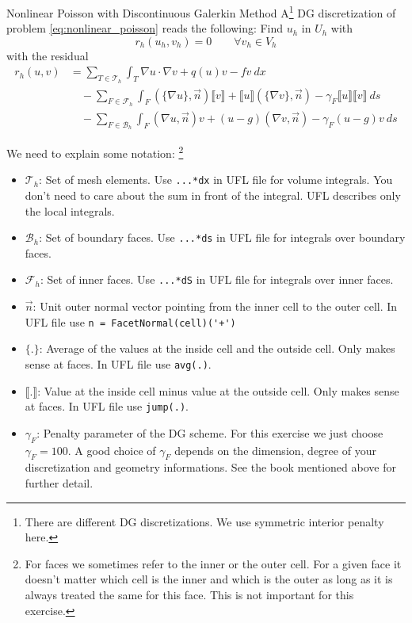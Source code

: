 \documentclass[12pt,a4paper]{article}
\newcommand\jump[1]{\llbracket #1 \rrbracket}
\newcommand\avg[1]{\{ #1 \}}
\begin{document}
\begin{Exercise}{Nonlinear Poisson with Discontinuous Galerkin Method}
  A\footnote{There are different DG discretizations. We use symmetric interior penalty here.} DG discretization of problem \eqref{eq:nonlinear_poisson} reads the
  following: Find $u_h$ in $U_h$ with
  \begin{equation*}
    r_h(u_h, v_h) = 0 \qquad \forall v_h \in V_h
  \end{equation*}
  with the residual
  \begin{equation}
    \label{eq:nonlinear_poisson_dg}
    \begin{aligned}
      r_h(u, v) & = \sum_{T\in\mathcal{T}_h}\int_T \nabla u\cdot\nabla v + q(u)v - fv\ dx\\
      &\quad - \sum_{F\in\mathcal{F}_h}\int_F (\avg{\nabla u}, \vec{n})\jump{v} + \jump{u}(\avg{\nabla v}, \vec{n}) - \gamma_F\jump{u}\jump{v}\ ds\\
      &\quad - \sum_{F\in\mathcal{B}_h}\int_F(\nabla u, \vec{n})v + (u-g)(\nabla v, \vec{n}) - \gamma_F(u-g)v\ ds
    \end{aligned}
  \end{equation}

  We need to explain some notation: \footnote{For faces we sometimes refer to the inner or the outer cell. For a given face it doesn't matter which cell is the inner and which is the outer as long as it is always treated the same for this face. This is not important for this exercise.}

  \begin{itemize}
  \item $\mathcal{T}_h$: Set of mesh elements. Use \lstinline{...*dx} in UFL
    file for volume integrals. You don't need to care about the sum in front of
    the integral. UFL describes only the local integrals.
  \item $\mathcal{B}_h$: Set of boundary faces. Use \lstinline{...*ds} in UFL
    file for integrals over boundary faces.
  \item $\mathcal{F}_h$: Set of inner faces. Use \lstinline{...*dS} in UFL file
    for integrals over inner faces.
  \item $\vec{n}$: Unit outer normal vector pointing from the inner cell to the outer cell. In UFL file use \lstinline{n = FacetNormal(cell)('+')}
  \item $\avg{.}$: Average of the values at the inside cell and the outside cell. Only makes sense at faces. In UFL file use \lstinline{avg(.)}.
  \item $\jump{.}$: Value at the inside cell minus value at the outside cell. Only makes sense at faces. In UFL file use \lstinline{jump(.)}.
  \item $\gamma_F$: Penalty parameter of the DG scheme. For this exercise we
    just choose $\gamma_F = 100$. A good choice of $\gamma_F$ depends on the
    dimension, degree of your discretization and geometry informations. See the
    book mentioned above for further detail.
  \end{itemize}


\end{Exercise}
\end{document}
